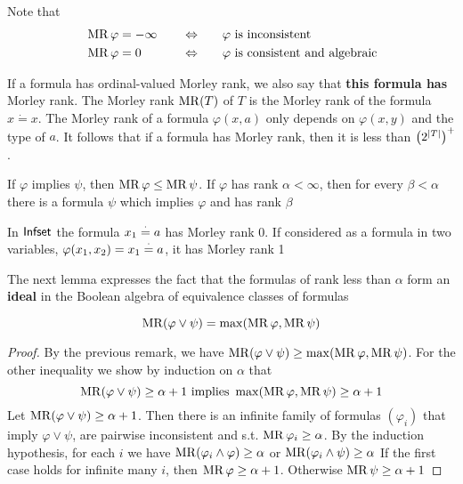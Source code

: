 \documentclass[11pt]{article}
\begin{document}
Note that
\begin{alignat*}{3}
&\operatorname{MR}\varphi=-\infty\quad&&\Leftrightarrow\quad&&\varphi\text{ is inconsistent}\\
&\operatorname{MR}\varphi=0\quad&&\Leftrightarrow\quad&&\varphi\text{ is consistent and algebraic}\\
\end{alignat*}

If a formula has ordinal-valued Morley rank, we also say that \textbf{this formula has} Morley rank. The
Morley rank \(\operatorname{MR}(T)\) of \(T\) is the Morley rank of the formula \(x\dot=x\).  The Morley rank
of a formula \(\varphi(x,a)\) only depends on \(\varphi(x,y)\) and the type of \(a\). It follows that if a
formula has Morley rank, then it is less than \(\left( 2^{\abs{T}} \right)^+\).  \label{Problem9}

\begin{remark}
If \(\varphi\) implies \(\psi\), then \(\operatorname{MR}\varphi\le\operatorname{MR}\psi\). If \(\varphi\) has rank \(\alpha<\infty\), then for every \(\beta<\alpha\) there is a
formula \(\psi\) which implies \(\varphi\) and has rank \(\beta\)
\end{remark}

\begin{examplle}[]
In \(\operatorname{\textsf{Infset}}\) the formula \(x_1\stackrel{\cdot}= a\) has Morley rank 0.
If considered as a formula in two variables, \(\varphi(x_1,x_2)=x_1\stackrel{\cdot}= a\), it has Morley rank 1
\end{examplle}

The next lemma expresses the fact that the formulas of rank less than \(\alpha\) form an \textbf{ideal} in the
Boolean algebra of equivalence classes of formulas
\begin{lemma}[]
\begin{equation*}
\operatorname{MR}(\varphi\vee\psi)=\max(\operatorname{MR}\varphi,\operatorname{MR}\psi)
\end{equation*}
\end{lemma}

\begin{proof}
By the previous remark, we have \(\operatorname{MR}(\varphi\vee\psi)\ge\max(\operatorname{MR}\varphi,\operatorname{MR}\psi)\). For the other inequality we show
by induction on \(\alpha\) that
\begin{equation*}
\operatorname{MR}(\varphi\vee\psi)\ge\alpha+1\text{ implies }\max(\operatorname{MR}\varphi,\operatorname{MR}\psi)\ge\alpha+1
\end{equation*}
Let \(\operatorname{MR}(\varphi\vee\psi)\ge\alpha+1\). Then there is an infinite family of formulas \((\varphi_i)\) that imply \(\varphi\vee\psi\),
are pairwise inconsistent and s.t. \(\operatorname{MR}\varphi_i\ge\alpha\). By the induction hypothesis, for each \(i\) we
have \(\operatorname{MR}(\varphi_i\wedge\varphi)\ge\alpha\) or \(\operatorname{MR}(\varphi_i\wedge\psi)\ge\alpha\)
If the first case holds for infinite many \(i\), then \(\operatorname{MR}\varphi\ge\alpha+1\). Otherwise \(\operatorname{MR}\psi\ge\alpha+1\)
\end{proof}
\end{document}
